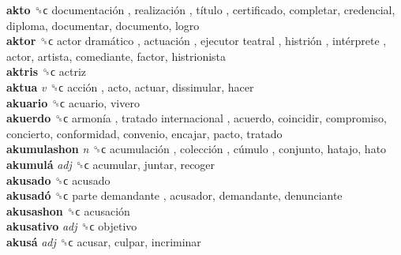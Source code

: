 \textbf{akto} ␝ϲ   documentación ,  realización ,  título , certificado, completar, credencial, diploma, documentar, documento, logro  \\
\textbf{aktor} ␝ϲ   actor dramático ,  actuación ,  ejecutor teatral ,  histrión ,  intérprete , actor, artista, comediante, factor, histrionista  \\
\textbf{aktris} ␝ϲ  actriz  \\
\textbf{aktua} \emph{v}  ␝ϲ   acción , acto, actuar, dissimular, hacer  \\
\textbf{akuario} ␝ϲ  acuario, vivero  \\
\textbf{akuerdo} ␝ϲ   armonía ,  tratado internacional , acuerdo, coincidir, compromiso, concierto, conformidad, convenio, encajar, pacto, tratado  \\
\textbf{akumulashon} \emph{n}  ␝ϲ   acumulación ,  colección ,  cúmulo , conjunto, hatajo, hato  \\
\textbf{akumulá} \emph{adj}  ␝ϲ  acumular, juntar, recoger  \\
\textbf{akusado} ␝ϲ  acusado  \\
\textbf{akusadó} ␝ϲ   parte demandante , acusador, demandante, denunciante  \\
\textbf{akusashon} ␝ϲ   acusación   \\
\textbf{akusativo} \emph{adj}  ␝ϲ  objetivo  \\
\textbf{akusá} \emph{adj}  ␝ϲ  acusar, culpar, incriminar  \\
